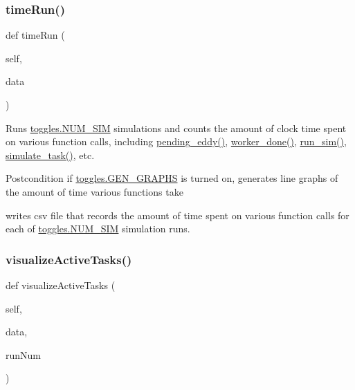\subsubsection{\texorpdfstring{time\+Run()}{timeRun()}}
{\footnotesize\ttfamily def time\+Run (\begin{DoxyParamCaption}\item[{}]{self,  }\item[{}]{data }\end{DoxyParamCaption})}



Runs \mbox{\hyperlink{namespacedynamicfilterapp_1_1toggles_a3baf5565851cd87736238d8dddfc1106}{toggles.\+N\+U\+M\+\_\+\+S\+IM}} simulations and counts the amount of clock time spent on various function calls, including \mbox{\hyperlink{namespacedynamicfilterapp_1_1views__helpers_a997e8cb3795ce79c24f95bec20063b13}{pending\+\_\+eddy()}}, \mbox{\hyperlink{namespacedynamicfilterapp_1_1views__helpers_af27860dfe5bfa6b2b8a1b29347eb918d}{worker\+\_\+done()}}, \mbox{\hyperlink{classdynamicfilterapp_1_1test__simulations_1_1_simulation_test_a7c1fa7ae63b7dde48b4c91c2eeda3b75}{run\+\_\+sim()}}, \mbox{\hyperlink{classdynamicfilterapp_1_1test__simulations_1_1_simulation_test_a99876860db527a8dd4dbc844f453e572}{simulate\+\_\+task()}}, etc. 

\begin{DoxyPostcond}{Postcondition}
if \mbox{\hyperlink{namespacedynamicfilterapp_1_1toggles_a57c1e3f291181d680f3ee118fa5c4ab8}{toggles.\+G\+E\+N\+\_\+\+G\+R\+A\+P\+HS}} is turned on, generates line graphs of the amount of time various functions take 

writes csv file that records the amount of time spent on various function calls for each of \mbox{\hyperlink{namespacedynamicfilterapp_1_1toggles_a3baf5565851cd87736238d8dddfc1106}{toggles.\+N\+U\+M\+\_\+\+S\+IM}} simulation runs. 
\end{DoxyPostcond}
\mbox{\label{classdynamicfilterapp_1_1test__simulations_1_1_simulation_test_ae8ee81e4b8e7bc6bdd2ecb18e89b6c1e}} 
\subsubsection{\texorpdfstring{visualize\+Active\+Tasks()}{visualizeActiveTasks()}}
{\footnotesize\ttfamily def visualize\+Active\+Tasks (\begin{DoxyParamCaption}\item[{}]{self,  }\item[{}]{data,  }\item[{}]{run\+Num }\end{DoxyParamCaption})}

